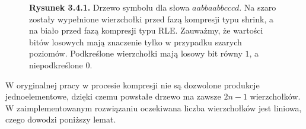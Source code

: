 \documentclass[declaration,shortabstract]{iithesis}
\theoremstyle{definition} \newtheorem{definition}{Definicja}[chapter]
\theoremstyle{remark} \newtheorem{remark}[definition]{Obserwacja}
\theoremstyle{plain} \newtheorem{theorem}[definition]{Twierdzenie}
\theoremstyle{remark} \newtheorem{example}{Przykład}[definition]
\theoremstyle{plain} \newtheorem{lemma}[definition]{Lemat}
\begin{document}
\begin{figure}[h]
    \begin{center}
        \caption*{\textbf{Rysunek 3.4.1.} Drzewo symbolu dla słowa $aabbaabbcccd$. Na szaro zostały wypełnione wierzchołki przed fazą kompresji typu shrink, a na biało przed fazą kompresji typu RLE. Zauważmy, że wartości bitów losowych mają znaczenie tylko w przypadku szarych poziomów. Podkreślone wierzchołki mają losowy bit równy $1$, a niepodkreślone $0$.}
    \end{center}
\end{figure}

W oryginalnej pracy w procesie kompresji nie są dozwolone produkcje jednoelementowe, dzięki czemu powstałe drzewo ma zawsze $2n-1$ wierzchołków. W zaimplementowanym rozwiązaniu oczekiwana liczba wierzchołków jest liniowa, czego dowodzi poniższy lemat.
\end{document}
